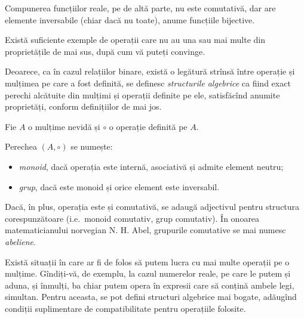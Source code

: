 Compunerea funcțiilor reale, pe de altă parte, nu este comutativă, dar are elemente inversabile
(chiar dacă nu toate), anume funcțiile bijective. 

Există suficiente exemple de operații care nu au una sau mai multe din proprietățile de mai sus,
după cum vă puteți convinge.

\vspace{1cm}

Deoarece, ca în cazul relațiilor binare, există o legătură strînsă între operație și mulțimea
pe care a fost definită, se definesc \emph{structurile algebrice} ca fiind exact perechi
alcătuite din mulțimi și operații definite pe ele, satisfăcînd anumite proprietăți,
conform definițiilor de mai jos.

\begin{definition}\label{def:str-alg} 
  Fie $A$ o mulțime nevidă și $\circ$ o operație definită pe $A$.

  Perechea $(A, \circ)$ se numește:
  \begin{itemize}
    \item \emph{monoid}, dacă operația este internă, asociativă și admite element neutru;
    \item \emph{grup}, dacă este monoid și orice element este inversabil.
  \end{itemize}

  Dacă, în plus, operația este și comutativă, se adaugă adjectivul  pentru
  structura corespunzătoare (i.e.\ monoid comutativ, grup comutativ). În onoarea
  matematicianului norvegian N. H. Abel, grupurile comutative se mai numesc \emph{abeliene}.
\end{definition}

Există situații în care ar fi de folos să putem lucra cu mai multe operații pe o mulțime.
Gîndiți-vă, de exemplu, la cazul numerelor reale, pe care le putem și aduna, și înmulți, ba
chiar putem opera în expresii care să conțină ambele legi, simultan.
Pentru aceasta, se pot defini structuri algebrice mai bogate, adăugînd condiții suplimentare
de compatibilitate pentru operațiile folosite.

